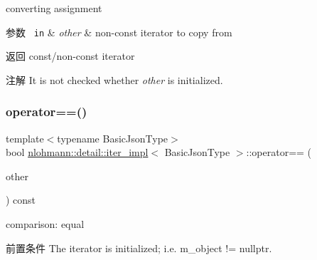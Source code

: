 converting assignment 


\begin{DoxyParams}[1]{参数}
\mbox{\texttt{ in}}  & {\em other} & non-\/const iterator to copy from \\
\hline
\end{DoxyParams}
\begin{DoxyReturn}{返回}
const/non-\/const iterator 
\end{DoxyReturn}
\begin{DoxyNote}{注解}
It is not checked whether {\itshape other} is initialized. 
\end{DoxyNote}
\mbox{\label{classnlohmann_1_1detail_1_1iter__impl_a2b592605b63ae7f5401996ffa3b14393}} 
\subsubsection{\texorpdfstring{operator==()}{operator==()}}
{\footnotesize\ttfamily template$<$typename Basic\+Json\+Type$>$ \\
bool \mbox{\hyperlink{classnlohmann_1_1detail_1_1iter__impl}{nlohmann\+::detail\+::iter\+\_\+impl}}$<$ Basic\+Json\+Type $>$\+::operator== (\begin{DoxyParamCaption}\item[{const \mbox{\hyperlink{classnlohmann_1_1detail_1_1iter__impl}{iter\+\_\+impl}}$<$ Basic\+Json\+Type $>$ \&}]{other }\end{DoxyParamCaption}) const\hspace{0.3cm}{\ttfamily [inline]}}



comparison\+: equal 

\begin{DoxyPrecond}{前置条件}
The iterator is initialized; i.\+e. {\ttfamily m\+\_\+object != nullptr}. 
\end{DoxyPrecond}
\mbox{\label{classnlohmann_1_1detail_1_1iter__impl_aaf3620b8dfa4bed8a9ac2b51dd55dbd7}} 
